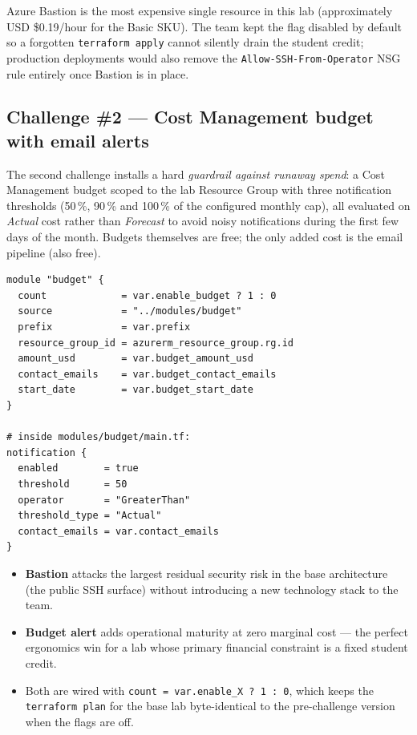 \documentclass[10pt,a4paper,twocolumn]{article}
\begin{document}
\begin{warningbox}
Azure Bastion is the most expensive single resource in this lab
(approximately USD \$0.19/hour for the Basic SKU). The team kept the
flag disabled by default so a forgotten \texttt{terraform apply} cannot
silently drain the student credit; production deployments would also
remove the \texttt{Allow-SSH-From-Operator} NSG rule entirely once
Bastion is in place.
\end{warningbox}

\subsection{Challenge \#2 --- Cost Management budget with email alerts}

The second challenge installs a hard \emph{guardrail against runaway
spend}: a Cost Management budget scoped to the lab Resource Group with
three notification thresholds (50\,\%, 90\,\% and 100\,\% of the
configured monthly cap), all evaluated on \emph{Actual} cost rather
than \emph{Forecast} to avoid noisy notifications during the first few
days of the month. Budgets themselves are free; the only added cost is
the email pipeline (also free).

\begin{lstlisting}[style=hclcode, caption={Budget module: three notifications, gated by feature flag}]
module "budget" {
  count             = var.enable_budget ? 1 : 0
  source            = "../modules/budget"
  prefix            = var.prefix
  resource_group_id = azurerm_resource_group.rg.id
  amount_usd        = var.budget_amount_usd
  contact_emails    = var.budget_contact_emails
  start_date        = var.budget_start_date
}

# inside modules/budget/main.tf:
notification {
  enabled        = true
  threshold      = 50
  operator       = "GreaterThan"
  threshold_type = "Actual"
  contact_emails = var.contact_emails
}
\end{lstlisting}

\begin{resultbox}[title={Why these two challenges?}]
\begin{itemize}
  \item \textbf{Bastion} attacks the largest residual security risk in
        the base architecture (the public SSH surface) without
        introducing a new technology stack to the team.
  \item \textbf{Budget alert} adds operational maturity at zero
        marginal cost --- the perfect ergonomics win for a lab whose
        primary financial constraint is a fixed student credit.
  \item Both are wired with \texttt{count = var.enable\_X ? 1 : 0},
        which keeps the \texttt{terraform plan} for the base lab
        byte-identical to the pre-challenge version when the flags
        are off.
\end{itemize}
\end{resultbox}
\end{document}
